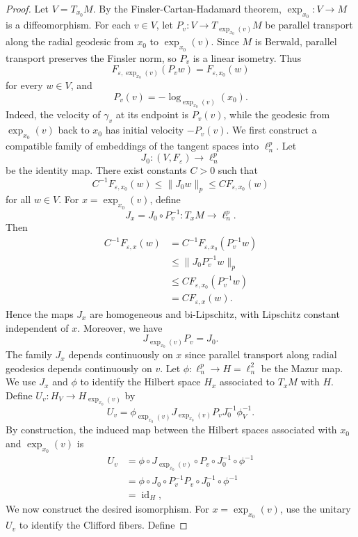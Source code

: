 \documentclass{article}
\theoremstyle{plain}
\theoremstyle{definition}
\renewcommand{\epsilon}{\varepsilon}
\theoremstyle{remark}
\begin{document}
	
	\begin{proof}
		Let $V=T_{x_0}M$. By the Finsler-Cartan-Hadamard theorem, $\exp_{x_0}:V\to M$ is a diffeomorphism. For each $v\in V$, let $P_v:V\to T_{\exp_{x_0}(v)}M$ be parallel transport along the radial geodesic from $x_0$ to $\exp_{x_0}(v)$. Since $M$ is Berwald, parallel transport preserves the Finsler norm, so $P_v$ is a linear isometry. Thus
		\[
		F_{\varepsilon,\exp_{x_0}(v)}(P_vw)
		=F_{\varepsilon,x_0}(w)
		\]
		for every $w\in V$, and
		$$
		P_v(v)=-\log_{\exp_{x_0}(v)}(x_0).
		$$
		Indeed, the velocity of $\gamma_v$ at its endpoint is $P_v(v)$, while the geodesic from $\exp_{x_0}(v)$ back to $x_0$ has initial velocity $-P_v(v)$. We first construct a compatible family of embeddings of the tangent spaces into $\ell_n^p$. Let
		\[
		J_0: (V,F_{\epsilon})\longrightarrow\ell_n^p
		\]
		be the identity map. There exist constants $C>0$ such that
		\[
		C^{-1}F_{\varepsilon,x_0}(w)
		\leq \|J_0w\|_p
		\leq CF_{\varepsilon,x_0}(w)
		\]
		for all $w\in V$. For $x=\exp_{x_0}(v)$, define
		\[
		J_x=J_0\circ P_v^{-1}:
		T_xM\longrightarrow\ell_n^p.
		\]
		Then
		\[
		\begin{split}
			C^{-1}F_{\varepsilon,x}(w)
			&=C^{-1}F_{\varepsilon,x_0}(P_v^{-1}w)\\
			&\leq \|J_0P_v^{-1}w\|_p\\
			&\leq CF_{\varepsilon,x_0}(P_v^{-1}w)\\
			&=CF_{\varepsilon,x}(w).
		\end{split}
		\]
		Hence the maps $J_x$ are homogeneous and bi-Lipschitz, with Lipschitz constant independent of $x$. Moreover, we have
		\[
		J_{\exp_{x_0}(v)}P_v=J_0.
		\]
		The family $J_x$ depends continuously on $x$ since parallel transport along radial geodesics depends continuously on $v$. Let $\phi:\ell_n^p\to H=\ell_n^2$ be the Mazur map. We use $J_x$ and $\phi$ to identify the Hilbert space $H_x$ associated to $T_xM$ with $H$.
		Define $U_v:H_V\to H_{\exp_{x_0}(v)}$ by
		$$
		U_v=\phi_{\exp_{x_0}(v)}J_{\exp_{x_0}(v)} P_v J_0^{-1} \phi_V^{-1}.
		$$
		By construction, the induced map between the Hilbert spaces associated with $x_0$ and $\exp_{x_0}(v)$ is
		\[
		\begin{split}
			U_v
			&=\phi\circ J_{\exp_{x_0}(v)}
			\circ P_v\circ J_0^{-1}\circ\phi^{-1}\\
			&=\phi\circ J_0\circ P_v^{-1}P_v
			\circ J_0^{-1}\circ\phi^{-1}\\
			&=\operatorname{id}_H,
		\end{split}
		\]
		We now construct the desired isomorphism. For $x=\exp_{x_0}(v)$, use the unitary $U_v$ to identify the Clifford fibers. Define

\end{proof}
\end{document}
